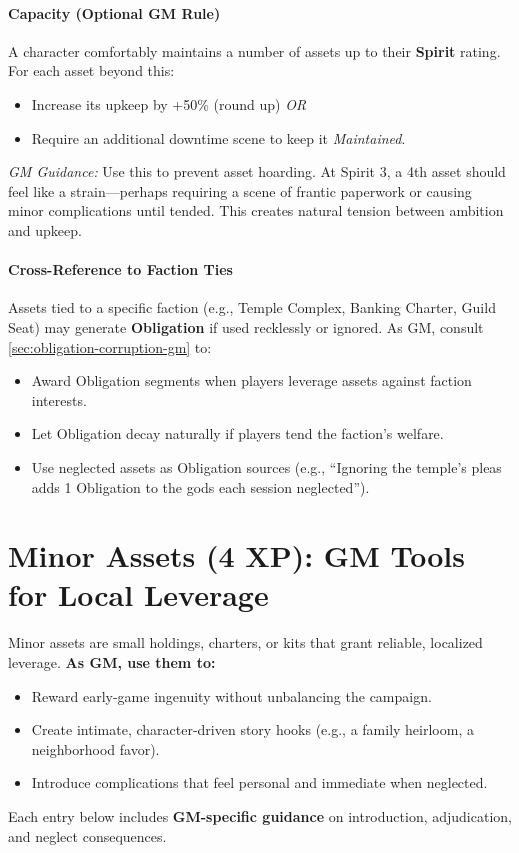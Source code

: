 \paragraph{Capacity (Optional GM Rule)}
A character comfortably maintains a number of assets up to their \textbf{Spirit} rating. For each asset beyond this:  
\begin{itemize}
  \item Increase its upkeep by +50\% (round up) \emph{OR}  
  \item Require an additional downtime scene to keep it \emph{Maintained}.  
\end{itemize}  
\textit{GM Guidance:} Use this to prevent asset hoarding. At Spirit 3, a 4th asset should feel like a strain---perhaps requiring a scene of frantic paperwork or causing minor complications until tended. This creates natural tension between ambition and upkeep.

\paragraph{Cross-Reference to Faction Ties}
Assets tied to a specific faction (e.g., Temple Complex, Banking Charter, Guild Seat) may generate \textbf{Obligation} if used recklessly or ignored. As GM, consult \ref{sec:obligation-corruption-gm} to:  
\begin{itemize}
  \item Award Obligation segments when players leverage assets against faction interests.  
  \item Let Obligation decay naturally if players tend the faction's welfare.  
  \item Use neglected assets as Obligation sources (e.g., ``Ignoring the temple's pleas adds 1 Obligation to the gods each session neglected'').  
\end{itemize}

\section{Minor Assets (4 XP): GM Tools for Local Leverage}
\label{sec:minor-assets}
Minor assets are small holdings, charters, or kits that grant reliable, localized leverage. \textbf{As GM, use them to:}  
\begin{itemize}
  \item Reward early-game ingenuity without unbalancing the campaign.  
  \item Create intimate, character-driven story hooks (e.g., a family heirloom, a neighborhood favor).  
  \item Introduce complications that feel personal and immediate when neglected.  
\end{itemize}
Each entry below includes \textbf{GM-specific guidance} on introduction, adjudication, and neglect consequences.

